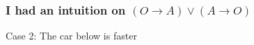 \documentclass[slidestop,compress,mathserif]{beamer}
\begin{document}
 \begin{frame}
  \frametitle{I had an intuition on $(O\rightarrow
  A)\lor (A\rightarrow O)$}

  { Case 2: The car below is faster}

\end{frame}
\end{document}
